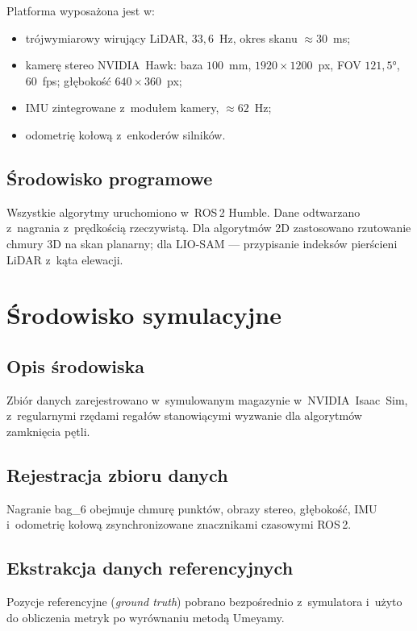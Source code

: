 Platforma wyposażona jest w:
\begin{itemize}
    \item trójwymiarowy wirujący LiDAR, $33{,}6$~Hz, okres skanu $\approx30$~ms;
    \item kamerę stereo NVIDIA~Hawk: baza $100$~mm, $1920\times1200$~px,
          FOV $121{,}5°$, $60$~fps; głębokość $640\times360$~px;
    \item IMU zintegrowane z~modułem kamery, $\approx62$~Hz;
    \item odometrię kołową z~enkoderów silników.
\end{itemize}

\subsection{Środowisko programowe}

Wszystkie algorytmy uruchomiono w~ROS\,2 Humble.
Dane odtwarzano z~nagrania z~prędkością rzeczywistą.
Dla algorytmów 2D zastosowano rzutowanie chmury 3D na skan planarny;
dla LIO-SAM --- przypisanie indeksów pierścieni LiDAR z~kąta elewacji.

\section{Środowisko symulacyjne}

\subsection{Opis środowiska}

Zbiór danych zarejestrowano w~symulowanym magazynie w~NVIDIA~Isaac~Sim,
z~regularnymi rzędami regałów stanowiącymi wyzwanie dla algorytmów
zamknięcia pętli.

\subsection{Rejestracja zbioru danych}

Nagranie bag\_6 obejmuje chmurę punktów, obrazy stereo, głębokość, IMU
i~odometrię kołową zsynchronizowane znacznikami czasowymi ROS\,2.

\subsection{Ekstrakcja danych referencyjnych}

Pozycje referencyjne (\textit{ground truth}) pobrano bezpośrednio z~symulatora
i~użyto do obliczenia metryk po wyrównaniu metodą Umeyamy.

